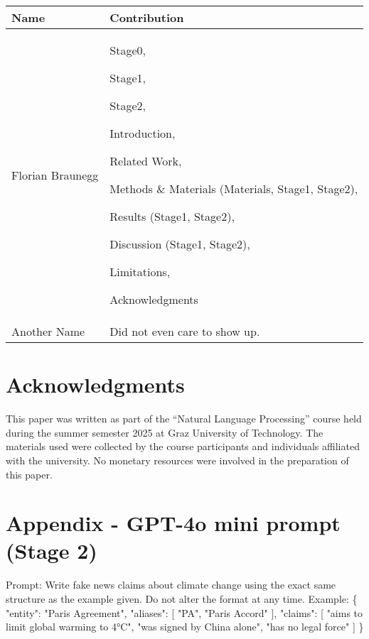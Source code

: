 \documentclass[12pt,a4paper,twocolumn]{article}
\begin{document}
\captionsetup{justification=raggedright, singlelinecheck=false, skip=20pt}
\vspace{1em}
\label{tab:evaluation_metrics}
\begin{center}
\begin{tabular}{|>{\centering\arraybackslash}m{2.5cm}|>{\centering\arraybackslash}m{4.5cm}|}
    \hline
    \textbf{Name} & \textbf{Contribution} \\
    \hline
    Florian Braunegg &
        Stage0,\par
        Stage1,\par
        Stage2,\par
        Introduction,\par
        Related Work,\par
        Methods \& Materials (Materials, Stage1, Stage2),\par
        Results (Stage1, Stage2),\par
        Discussion (Stage1, Stage2),\par
        Limitations,\par
        Acknowledgments
    \\
    \hline
    Another Name & Did not even care to show up. \\
    \hline
\end{tabular}
\end{center}
\vspace{1em}
\section*{Acknowledgments}
This paper was written as part of the “Natural Language Processing” course held during the summer semester 2025 at Graz University of Technology. The materials used were collected by the course participants and individuals affiliated with the university. No monetary resources were involved in the preparation of this paper.




\appendix

\section{Appendix - GPT-4o mini prompt (Stage 2)}

Prompt:
Write fake news claims about climate change using the exact same structure as the example given. Do not alter the format at any time. Example: \{
  "entity": "Paris Agreement",
  "aliases": [ "PA", "Paris Accord" ],
  "claims": [
    "aims to limit global warming to 4°C",
    "was signed by China alone",
    "has no legal force"
  ]
\}
\end{document}
